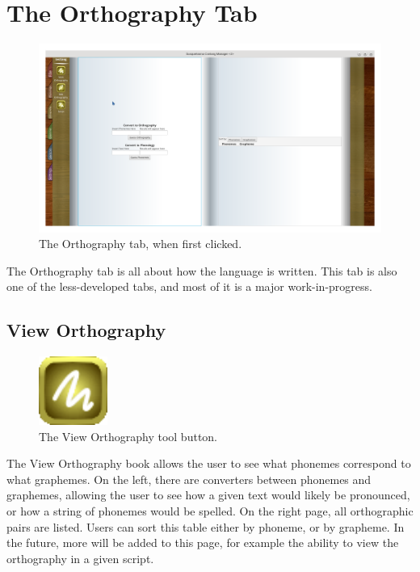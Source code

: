 \documentclass{report}
\begin{document}
	\chapter{The Orthography Tab}
	\begin{figure}[ht]
		\centering
		\includegraphics[width=1\linewidth]{img/orthography-tab}
		\caption{The Orthography tab, when first clicked.}
		\label{fig:orthography-tab}
	\end{figure}
	The Orthography tab is all about how the language is written. This tab is also one of the less-developed tabs, and most of it is a major work-in-progress.
	\newpage
	\section{View Orthography}
	\begin{figure}
		\centering
		\includegraphics[width=0.2\textwidth]{img/view-orthography}
		\caption{The View Orthography tool button.}
		\label{fig:view-orthography}
	\end{figure}
	The View Orthography book allows the user to see what phonemes correspond to what graphemes. On the left, there are converters between phonemes and graphemes, allowing the user to see how a given text would likely be pronounced, or how a string of phonemes would be spelled. On the right page, all orthographic pairs are listed. Users can sort this table either by phoneme, or by grapheme. In the future, more will be added to this page, for example the ability to view the orthography in a given script.
\end{document}
